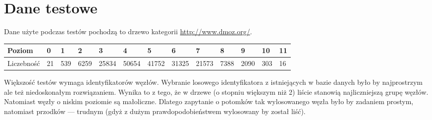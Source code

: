 

% 



\section{Dane testowe}


Dane użyte podczas testów pochodzą to drzewo kategorii \url{http://www.dmoz.org/}.


\begin{tabular}{|l|l@{ }l@{ }l@{ }l@{ }l@{ }l@{ }l@{ }l@{ }l@{ }l@{ }l@{ }l@{ }|}
\hline
Poziom     & 0      & 1     & 2     & 3     & 4     & 5     & 6     & 7     & 8     & 9     & 10    & 11 \\
\hline
Liczebność & 21     & 539   & 6259  & 25834 & 50654 & 41752 & 31325 & 21573 & 7388  & 2090  & 303   & 16 \\
\hline
\end{tabular}


Większość testów wymaga identyfikatorów węzłów. 
Wybranie losowego identyfikatora z istniejących w bazie danych było by najprostrzym 
ale też niedoskonałym  rozwiązaniem.
Wynika to z tego, że w drzewe (o stopniu większym niż 2) 
liście stanowią najliczniejszą grupę węzłów.
Natomiast węzły o niskim poziomie są małoliczne.
Dlatego zapytanie o potomków tak wylosowanego węzła było by zadaniem prostym, natomiast przodków --- trudnym (gdyż z dużym prawdopodobieństwem wylosowany by został liść).

